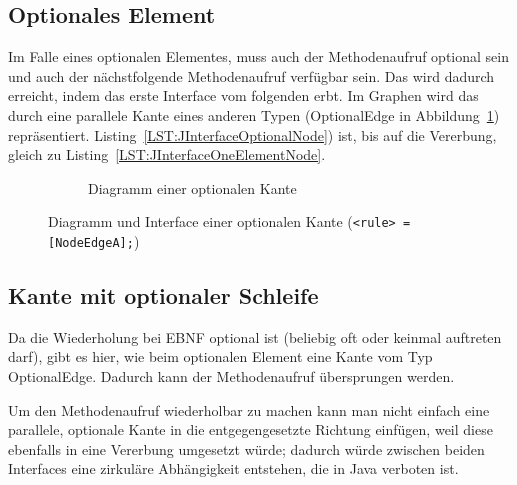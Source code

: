 \documentclass[../InterneDSLs.tex]{subfiles}
\begin{document}
\subsection{Optionales Element}
Im Falle eines optionalen Elementes, muss auch der Methodenaufruf optional sein und auch der nächstfolgende Methodenaufruf verfügbar sein. Das wird dadurch erreicht, indem das erste Interface vom folgenden erbt. Im Graphen wird das durch eine parallele Kante eines anderen Typen (OptionalEdge in Abbildung~\ref{FIG:DiagramOptionalNode}) repräsentiert. Listing~\ref{LST:JInterfaceOptionalNode}) ist, bis auf die Vererbung, gleich zu Listing~\ref{LST:JInterfaceOneElementNode}.
\begin{figure}[ht]
\centering
  \begin{subfigure}[c]{0.49\textwidth}
    \caption{Diagramm einer optionalen Kante}
    \label{FIG:DiagramOptionalNode}
  \end{subfigure}
  \begin{subfigure}[c]{0.49\textwidth}
    
  \end{subfigure}
  \caption{Diagramm und Interface einer optionalen Kante (\texttt{<rule> = [NodeEdgeA];})}
  \label{FIG:OptionalNode}
\end{figure}

\subsection{Kante mit optionaler Schleife}
Da die Wiederholung bei EBNF optional ist (beliebig oft oder keinmal auftreten darf), gibt es hier, wie beim optionalen Element eine Kante vom Typ OptionalEdge. Dadurch kann der Methodenaufruf übersprungen werden.

Um den Methodenaufruf wiederholbar zu machen kann man nicht einfach eine parallele, optionale Kante in die entgegengesetzte Richtung einfügen, weil diese ebenfalls in eine Vererbung umgesetzt würde; dadurch würde zwischen beiden Interfaces eine zirkuläre Abhängigkeit entstehen, die in Java verboten ist.
\end{document}
